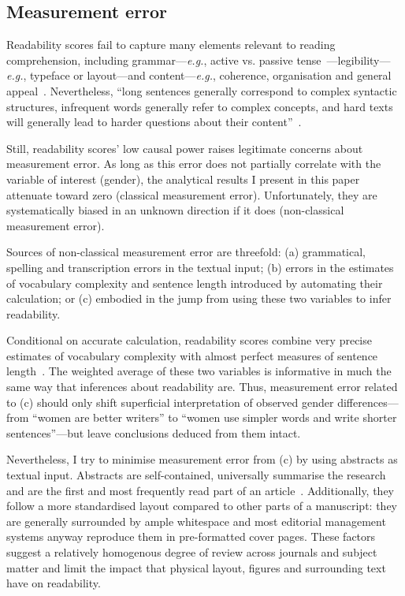 \begin{appendices}
\begin{refsection}


\subsection{Measurement error}
\label{appendixmeasurementerror}

Readability scores fail to capture many elements relevant to reading comprehension, including gram\-mar---\emph{e.g.}, active vs. passive tense~\citep{Coleman1964,Coleman1965}---legibility---\emph{e.g.}, typeface or layout---and content---\emph{e.g.}, coherence, organisation and general appeal~\citep{Kintsch1984,Kemper1983,Meyer1982,Armbruster1984}. Nevertheless, ``long sentences generally correspond to complex syntactic structures, infrequent words generally refer to complex concepts, and hard texts will generally lead to harder questions about their content''~\citep[][p. 222]{Kintsch1984}.

Still, readability scores' low causal power raises legitimate concerns about measurement error. As long as this error does not partially correlate with the variable of interest (gender), the analytical results I present in this paper attenuate toward zero (classical measurement error). Unfortunately, they are systematically biased in an unknown direction if it does (non-classical measurement error).

Sources of non-classical measurement error are threefold: (a) grammatical, spelling and transcription errors in the textual input; (b) errors in the estimates of vocabulary complexity and sentence length introduced by automating their calculation; or (c) embodied in the jump from using these two variables to infer readability.

Conditional on accurate calculation, readability scores combine very precise estimates of vocabulary complexity with almost perfect measures of sentence length~\citep[for a discussion, see][]{Chall1995}. The weighted average of these two variables is informative in much the same way that inferences about readability are. Thus, measurement error related to (c) should only shift superficial interpretation of observed gender differences---from ``women are better writers'' to ``women use simpler words and write shorter sentences''---but leave conclusions deduced from them intact.

Nevertheless, I try to minimise measurement error from (c) by using abstracts as textual input. Abstracts are self-contained, universally summarise the research and are the first and most frequently read part of an article~\citep{King2006}. Additionally, they follow a more standardised layout compared to other parts of a manuscript: they are generally surrounded by ample whitespace and most editorial management systems anyway reproduce them in pre-formatted cover pages. These factors suggest a relatively homogenous degree of review across journals and subject matter and limit the impact that physical layout, figures and surrounding text have on readability.


\end{refsection}
\end{appendices}
